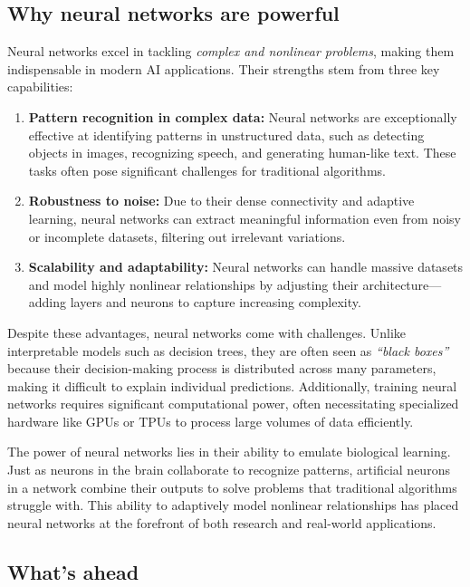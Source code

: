 \documentclass[
  11pt,
]{book}
\theoremstyle{definition}
\theoremstyle{definition}
\theoremstyle{definition}
\theoremstyle{definition}
\theoremstyle{remark}
\begin{document}
\subsection*{Why neural networks are powerful}\label{why-neural-networks-are-powerful}


Neural networks excel in tackling \emph{complex and nonlinear problems}, making them indispensable in modern AI applications. Their strengths stem from three key capabilities:

\begin{enumerate}
\def\labelenumi{\arabic{enumi}.}
\item
  \textbf{Pattern recognition in complex data:} Neural networks are exceptionally effective at identifying patterns in unstructured data, such as detecting objects in images, recognizing speech, and generating human-like text. These tasks often pose significant challenges for traditional algorithms.
\item
  \textbf{Robustness to noise:} Due to their dense connectivity and adaptive learning, neural networks can extract meaningful information even from noisy or incomplete datasets, filtering out irrelevant variations.
\item
  \textbf{Scalability and adaptability:} Neural networks can handle massive datasets and model highly nonlinear relationships by adjusting their architecture---adding layers and neurons to capture increasing complexity.
\end{enumerate}

Despite these advantages, neural networks come with challenges. Unlike interpretable models such as decision trees, they are often seen as \emph{``black boxes''} because their decision-making process is distributed across many parameters, making it difficult to explain individual predictions. Additionally, training neural networks requires significant computational power, often necessitating specialized hardware like GPUs or TPUs to process large volumes of data efficiently.

The power of neural networks lies in their ability to emulate biological learning. Just as neurons in the brain collaborate to recognize patterns, artificial neurons in a network combine their outputs to solve problems that traditional algorithms struggle with. This ability to adaptively model nonlinear relationships has placed neural networks at the forefront of both research and real-world applications.

\subsection*{What's ahead}\label{whats-ahead}
\end{document}
